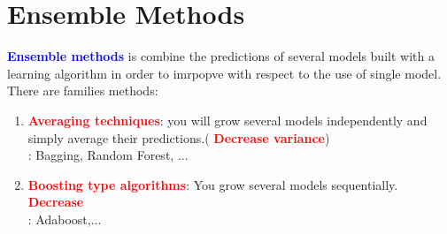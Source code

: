 \section{Ensemble Methods}
\textcolor{blue}{\textbf{Ensemble methods}} is combine the predictions of several models built with a learning algorithm in order to imrpopve with respect to the use of single model.\\
There are families methods:
\begin{enumerate}
    \item \textcolor{red}{\textbf{Averaging techniques}}: you will grow several models independently and simply average their predictions.( \textcolor{red}{\textbf{Decrease variance}})\\
    \Example : Bagging, Random Forest, ...\\
    \item  \textcolor{red}{\textbf{Boosting type algorithms}}: You grow several models sequentially.  \textcolor{red}{\textbf{Decrease \Biais}}\\
    \Example: Adaboost,...
\end{enumerate}
